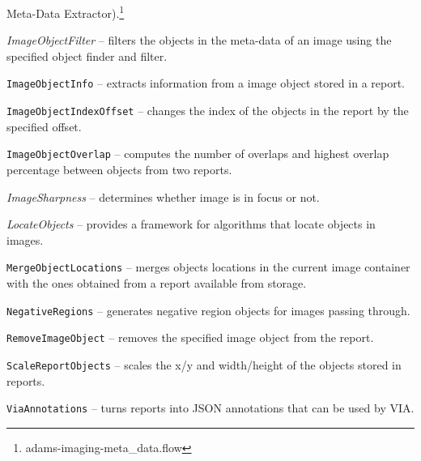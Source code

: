 \documentclass[a4paper]{book}
\begin{document}
\begin{tight_itemize}
	Meta-Data Extractor\cite{metadataextractor}).\footnote{adams-imaging-meta\_data.flow}
	\item \textit{ImageObjectFilter} -- filters the objects in the meta-data of an image
	using the specified object finder and filter.
	\item \texttt{ImageObjectInfo} -- extracts information from a image object
	stored in a report.
	\item \texttt{ImageObjectIndexOffset} -- changes the index of the objects in the
	report by the specified offset.
	\item \texttt{ImageObjectOverlap} -- computes the number of overlaps
	and highest overlap percentage between objects from two reports.
	\item \textit{ImageSharpness} -- determines whether image is in focus or not.
	\item \textit{LocateObjects} -- provides a framework for algorithms that
	locate objects in images.
	\item \texttt{MergeObjectLocations} -- merges objects locations
	in the current image container with the ones obtained from a report
	available from storage.
	\item \texttt{NegativeRegions} -- generates negative region objects
	for images passing through.
	\item \texttt{RemoveImageObject} -- removes the specified image object
	from the report.
	\item \texttt{ScaleReportObjects} -- scales the x/y and width/height
	of the objects stored in reports.
	\item \texttt{ViaAnnotations} -- turns reports into JSON annotations that
	can be used by VIA\cite{via}.
\end{tight_itemize}



\end{document}
